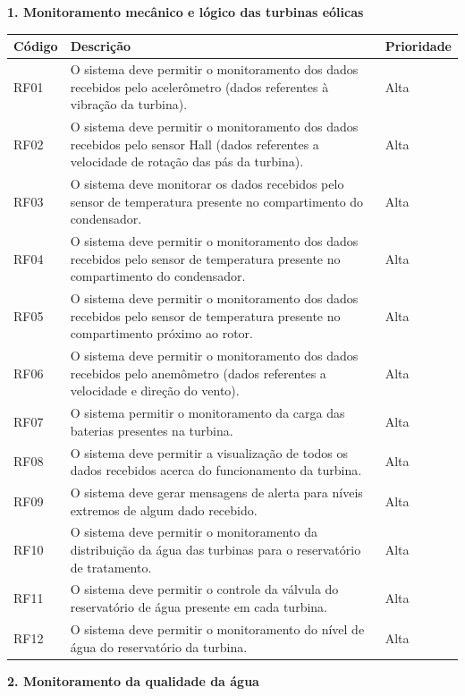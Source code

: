   \textbf{1. Monitoramento mecânico e lógico das turbinas eólicas}
  
  \begin{longtable}{|m{3.0cm}|m{7.5cm}|m{3.5cm}|}
   \hline
\textbf{Código} & \textbf{Descrição} & \textbf{Prioridade}\\
\hline
RF01 & O sistema deve permitir o monitoramento dos dados recebidos pelo acelerômetro (dados referentes à vibração da turbina). & Alta\\
\hline
RF02 & O sistema deve permitir o monitoramento dos dados recebidos pelo sensor Hall (dados referentes a velocidade de rotação das pás da turbina). & Alta\\
\hline
RF03 & O sistema deve monitorar os dados recebidos pelo sensor de temperatura presente no compartimento do condensador. & Alta\\
\hline
RF04 & O sistema deve permitir o monitoramento dos dados recebidos pelo sensor de temperatura presente no compartimento do condensador. & Alta\\
\hline
RF05 & O sistema deve permitir o monitoramento dos dados recebidos pelo sensor de temperatura presente no compartimento próximo ao rotor. & Alta\\
\hline
RF06 & O sistema deve permitir o monitoramento dos dados recebidos pelo anemômetro (dados referentes a velocidade e direção do vento). & Alta\\
\hline
RF07 & O sistema permitir o monitoramento da carga das baterias presentes na turbina. & Alta\\
\hline
RF08 & O sistema deve permitir a visualização de todos os dados recebidos acerca do funcionamento da turbina. & Alta\\
\hline
RF09 & O sistema deve gerar mensagens de alerta para níveis extremos de algum dado recebido. & Alta\\
\hline
RF10 & O sistema deve permitir o monitoramento da distribuição da água das turbinas para o reservatório de tratamento. & Alta\\
\hline
RF11 & O sistema deve permitir o controle da válvula do reservatório de água presente em cada turbina. & Alta\\
\hline
RF12 & O sistema deve permitir o monitoramento do nível de água do reservatório da turbina. & Alta\\
\hline
   
  \end{longtable}

  \textbf{2. Monitoramento da qualidade da água}
  
